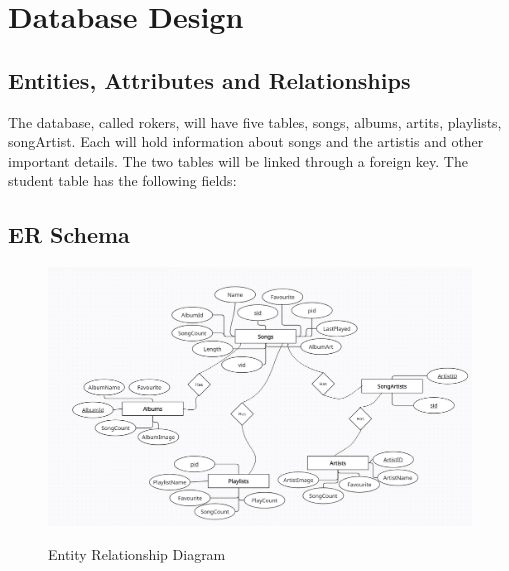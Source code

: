 \chapter{Database Design}

\section{Entities, Attributes and Relationships}
The database, called rokers, will have five tables, songs, albums, artits, playlists, songArtist. Each will hold information about songs and the artistis and other important details. The two
tables will be linked through a foreign key. The student table has the following fields:\\



\section{ER Schema}
\begin{figure}[H]
\centering
\caption{Entity Relationship Diagram}
\includegraphics[width=\textwidth,height=\textheight,keepaspectratio]{./erd.png}
\\[0.2in]
\label{fig:Entitiy Relationship Diagram}
\end{figure}

\pagebreak
\thispagestyle{fancy}

